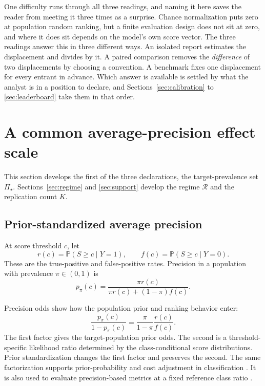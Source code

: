 \documentclass[11pt]{article}
\newcommand{\Regime}{\mathcal{R}}
\newcommand{\PSet}{\Pi_\star}
\newcommand{\Prb}{\mathbb{P}}
\theoremstyle{remark}
\begin{document}
One difficulty runs through all three readings, and naming it here saves the reader from meeting it three times as a surprise. Chance normalization puts zero at population random ranking, but a finite evaluation design does not sit at zero, and where it does sit depends on the model's own score vector. The three readings answer this in three different ways. An isolated report estimates the displacement and divides by it. A paired comparison removes the \emph{difference} of two displacements by choosing a convention. A benchmark fixes one displacement for every entrant in advance. Which answer is available is settled by what the analyst is in a position to declare, and Sections~\ref{sec:calibration} to \ref{sec:leaderboard} take them in that order.

\section{A common average-precision effect scale}
\label{sec:common-scale}

This section develops the first of the three declarations, the target-prevalence set $\PSet$. Sections~\ref{sec:regime} and \ref{sec:support} develop the regime $\Regime$ and the replication count $K$.

\subsection{Prior-standardized average precision}

At score threshold $c$, let
\[
r(c)=\Prb(S\geq c\mid Y=1),
\qquad
f(c)=\Prb(S\geq c\mid Y=0).
\]
These are the true-positive and false-positive rates. Precision in a population with prevalence $\pi\in(0,1)$ is
\begin{equation}
p_\pi(c)
=
\frac{\pi r(c)}
{\pi r(c)+(1-\pi)f(c)}.
\label{eq:reference-precision}
\end{equation}

Precision odds show how the population prior and ranking behavior enter:
\begin{equation}
\frac{p_\pi(c)}{1-p_\pi(c)}
=
\frac{\pi}{1-\pi}
\frac{r(c)}{f(c)}.
\label{eq:precision-odds}
\end{equation}
The first factor gives the target-population prior odds. The second is a threshold-specific likelihood ratio determined by the class-conditional score distributions. Prior standardization changes the first factor and preserves the second. The same factorization supports prior-probability and cost adjustment in classification \cite{elkan2001foundations}. It is also used to evaluate precision-based metrics at a fixed reference class ratio \cite{siblini2020calibration,degeest2016online}.
\end{document}
